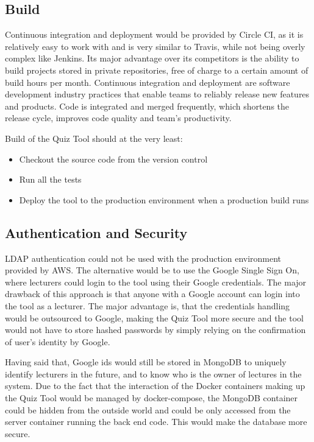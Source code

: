 \subsection{Build}
Continuous integration and deployment would be provided by Circle CI\cite{26}, as it is relatively easy
to work with and is very similar to Travis\cite{27}, while not being overly complex like Jenkins\cite{23}.
Its major advantage over its competitors is the ability to build projects stored in private
repositories, free of charge to a certain amount of build hours per month. Continuous integration
and deployment are software development industry practices that enable teams to reliably release
new features and products. Code is integrated and merged frequently, which shortens the release cycle,
improves code quality and team's productivity\cite{28}.

Build of the Quiz Tool should at the very least:
\begin{itemize}
  \item Checkout the source code from the version control
  \item Run all the tests
  \item Deploy the tool to the production environment when a production build runs
\end{itemize}

\subsection{Authentication and Security}
LDAP authentication could not be used with the production environment provided by
AWS. The alternative would be to use the Google Single Sign On\cite{2}, where lecturers
could login to the tool using their Google credentials. The major drawback of this
approach is that anyone with a Google account can login into the tool as a lecturer.
The major advantage is, that the credentials handling would be outsourced to Google,
making the Quiz Tool more secure and the tool would not have to store hashed passwords
by simply relying on the confirmation of user's identity by Google.

Having said that, Google ids would still be stored in MongoDB to uniquely identify
lecturers in the future, and to know who is the owner of lectures in the system.
Due to the fact that the interaction of the Docker containers making up the Quiz Tool would
be managed by docker-compose, the MongoDB container could be hidden from the outside world
and could be only accessed from the server container running the back end code. This would
make the database more secure.

